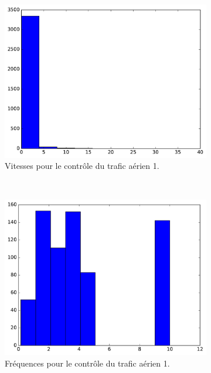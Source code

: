 	\begin{figure}
		\begin{subfigure}[t]{\subImgWaStats}
			\centering
			\includegraphics[width=\textwidth]{figures/ch3/mhA_speed}
			\caption{Vitesses pour le contrôle du trafic aérien 1.}
			\label{fig:mhA_speed}
		\end{subfigure}
		~
		\begin{subfigure}[t]{\subImgWaStats}
			\centering
			\includegraphics[width=\textwidth]{figures/ch3/mhA_frequency}
			\caption{Fréquences pour le contrôle du trafic aérien 1.}
			\label{fig:mhA_frequency}
		\end{subfigure}
		~
		\begin{subfigure}[t]{\subImgWaStats}

\end{subfigure}
\end{figure}
